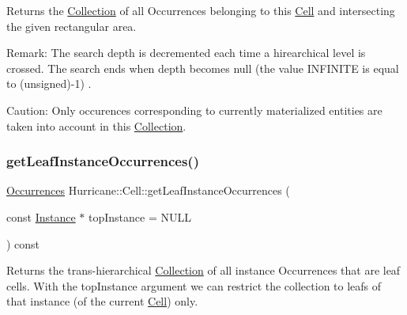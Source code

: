 Returns the \mbox{\hyperlink{classHurricane_1_1Collection}{Collection}} of all Occurrences belonging to this \mbox{\hyperlink{classHurricane_1_1Cell}{Cell}} and intersecting the given rectangular area.

\begin{DoxyParagraph}{Remark\+: The search depth is decremented each time a hirearchical}
level is crossed. The search ends when depth becomes null (the value {\ttfamily I\+N\+F\+I\+N\+I\+TE} is equal to {\ttfamily }(unsigned)-\/1) .
\end{DoxyParagraph}
\begin{DoxyParagraph}{Caution\+: Only occurences corresponding to currently materialized}
entities are taken into account in this \mbox{\hyperlink{classHurricane_1_1Collection}{Collection}}. 
\end{DoxyParagraph}
\mbox{\label{classHurricane_1_1Cell_a7d5a16e085ef5375862560e3c3eb4ea8}} 
\subsubsection{\texorpdfstring{get\+Leaf\+Instance\+Occurrences()}{getLeafInstanceOccurrences()}}
{\footnotesize\ttfamily \mbox{\hyperlink{namespaceHurricane_a1912927c128eee859af62dbe4cbe0a6b}{Occurrences}} Hurricane\+::\+Cell\+::get\+Leaf\+Instance\+Occurrences (\begin{DoxyParamCaption}\item[{const \mbox{\hyperlink{classHurricane_1_1Instance}{Instance}} $\ast$}]{top\+Instance = {\ttfamily NULL} }\end{DoxyParamCaption}) const}

Returns the trans-\/hierarchical \mbox{\hyperlink{classHurricane_1_1Collection}{Collection}} of all instance Occurrences that are leaf cells. With the {\ttfamily top\+Instance} argument we can restrict the collection to leafs of that instance (of the current \mbox{\hyperlink{classHurricane_1_1Cell}{Cell}}) only. \mbox{\label{classHurricane_1_1Cell_ac32e4f232a8fc030aa809fe6565d8d95}} 
